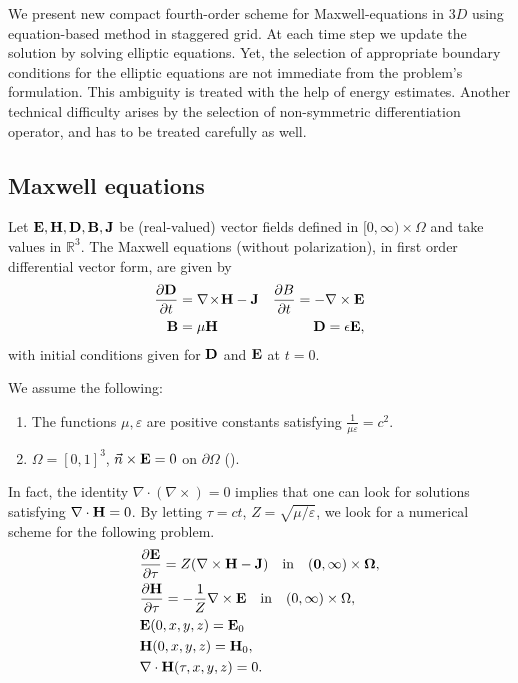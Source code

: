 \documentclass[12pt,reqno]{amsart}
\newcommand{\R}{\mathbb{R}}
\newcommand{\e}{{\bf E}}
\newcommand{\h}{{\bf H}}
\theoremstyle{definition}
\numberwithin{equation}{section}
\begin{document}
	We present new compact fourth-order scheme for Maxwell-equations in $3D$ using equation-based method in staggered grid.
	At each time step we update the solution by solving  elliptic equations. Yet, the selection of appropriate boundary conditions for the elliptic equations are not immediate from the problem's formulation. This ambiguity is treated with the help of energy estimates.
	Another technical   difficulty   arises by the selection of non-symmetric differentiation operator, and has to be treated carefully as well.
	
	\subsection{Maxwell equations}
	Let $\e,\h,\bf{D},\bf{B},\bf{J}$ be (real-valued) vector fields defined in  $[0,\infty)\times\Omega$ and take values in $\R^3$.
	The Maxwell equations (without polarization), in first order differential vector form, are given by
	\begin{align*}
		\frac{\partial \bf{D}}{\partial t} &= \nabla \!\times\! \bf{H} - \bf{J} &
		\frac{\partial B}{\partial t}=-\nabla\times \e &\\
		\bf{B} &= \mu \bf{H} & \bf{D} = \epsilon \bf{E},
	\end{align*}
	with initial conditions given for $\bf{D}$ and $\bf{E}$ at $t=0$.

We assume the following:
\begin{enumerate}
	\item  The functions $\mu,\varepsilon$ are    positive constants satisfying $\frac{1}{\mu \varepsilon}=c^2$.
	\item  $\Omega=[0,1]^3$, $\vec{n} \times {\bf E}=0$ on $\partial \Omega$ (\cite[Section 8]{rolf}).
\end{enumerate}
In fact, the identity $\nabla\cdot (\nabla\times)=0$ implies that one can look for solutions  satisfying $\nabla\cdot \h=0$.
By letting  $ \tau=ct$,  $Z=\sqrt{\mu/\varepsilon}$, we look for a numerical scheme for the following problem.
	\begin{align}
	\label{eq:maxwellv}
	&\notag
\frac{\partial {\bf E}}{\partial \tau }=Z(\nabla \times \bf{H}-{\bf J}) \quad \mathrm{in} \quad  (0,\infty)\times \Omega,\\&\notag
 \frac{\partial {\bf H}}{\partial \tau }=-\frac{1}{Z}\nabla \times {\bf E} \quad \mathrm{in} \quad  (0,\infty)\times \Omega,\\&\notag
 \e(0,x,y,z)=\e_0 \\& \h(0,x,y,z)=\h_0,\\&\notag
	\nabla\cdot \h(\tau,x,y,z) = 0.\notag
\end{align}
\end{document}
